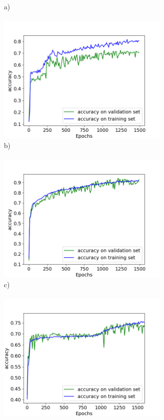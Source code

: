 \documentclass[]{article}
\begin{document}
  

\thispagestyle{empty}



\begin{figure}
    a)~~~~~~~~~~~~~~~~~~~~~~~~~~~~~~~~~~~~~~~~~~~~~~~~~~~~~~~~~~~\\    \includegraphics[width=0.75\textwidth]{figures/v12.png}
    b)~~~~~~~~~~~~~~~~~~~~~~~~~~~~~~~~~~~~~~~~~~~~~~~~~~~~~~~~~~~\\ \includegraphics[width=0.75\textwidth]{figures/v13.png}
    c)~~~~~~~~~~~~~~~~~~~~~~~~~~~~~~~~~~~~~~~~~~~~~~~~~~~~~~~~~~~\\ \includegraphics[width=0.75\textwidth]{figures/v25.png}
\end{figure}


\end{document}
